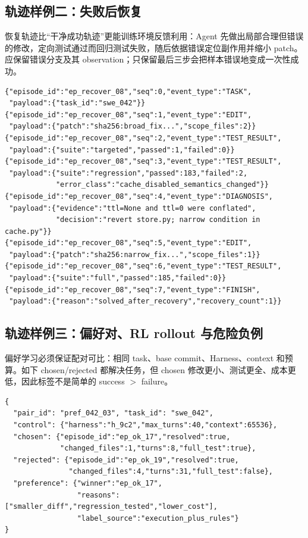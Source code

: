 \documentclass[10pt,a4paper,UTF8,fontset=none]{ctexart}
\begin{document}
\newpage
\subsection{轨迹样例二：失败后恢复}

恢复轨迹比“干净成功轨迹”更能训练环境反馈利用：Agent 先做出局部合理但错误的修改，定向测试通过而回归测试失败，随后依据错误定位副作用并缩小 patch。应保留错误分支及其 observation；只保留最后三步会把样本错误地变成一次性成功。

\begin{lstlisting}[style=codeblock,caption={错误 patch 经回归反馈修正的恢复轨迹},label={zh:lst:trajectory-recovery}]
{"episode_id":"ep_recover_08","seq":0,"event_type":"TASK",
 "payload":{"task_id":"swe_042"}}
{"episode_id":"ep_recover_08","seq":1,"event_type":"EDIT",
 "payload":{"patch":"sha256:broad_fix...","scope_files":2}}
{"episode_id":"ep_recover_08","seq":2,"event_type":"TEST_RESULT",
 "payload":{"suite":"targeted","passed":1,"failed":0}}
{"episode_id":"ep_recover_08","seq":3,"event_type":"TEST_RESULT",
 "payload":{"suite":"regression","passed":183,"failed":2,
            "error_class":"cache_disabled_semantics_changed"}}
{"episode_id":"ep_recover_08","seq":4,"event_type":"DIAGNOSIS",
 "payload":{"evidence":"ttl=None and ttl=0 were conflated",
            "decision":"revert store.py; narrow condition in cache.py"}}
{"episode_id":"ep_recover_08","seq":5,"event_type":"EDIT",
 "payload":{"patch":"sha256:narrow_fix...","scope_files":1}}
{"episode_id":"ep_recover_08","seq":6,"event_type":"TEST_RESULT",
 "payload":{"suite":"full","passed":185,"failed":0}}
{"episode_id":"ep_recover_08","seq":7,"event_type":"FINISH",
 "payload":{"reason":"solved_after_recovery","recovery_count":1}}
\end{lstlisting}

\subsection{轨迹样例三：偏好对、RL rollout 与危险负例}

偏好学习必须保证配对可比：相同 task、base commit、Harness、context 和预算。如下 chosen/rejected 都解决任务，但 chosen 修改更小、测试更全、成本更低，因此标签不是简单的 success $>$ failure。

\begin{lstlisting}[style=codeblock,caption={同题轨迹偏好对},label={zh:lst:trajectory-preference}]
{
  "pair_id": "pref_042_03", "task_id": "swe_042",
  "control": {"harness":"h_9c2","max_turns":40,"context":65536},
  "chosen": {"episode_id":"ep_ok_17","resolved":true,
             "changed_files":1,"turns":8,"full_test":true},
  "rejected": {"episode_id":"ep_ok_19","resolved":true,
               "changed_files":4,"turns":31,"full_test":false},
  "preference": {"winner":"ep_ok_17",
                 "reasons":["smaller_diff","regression_tested","lower_cost"],
                 "label_source":"execution_plus_rules"}
}
\end{lstlisting}
\end{document}
